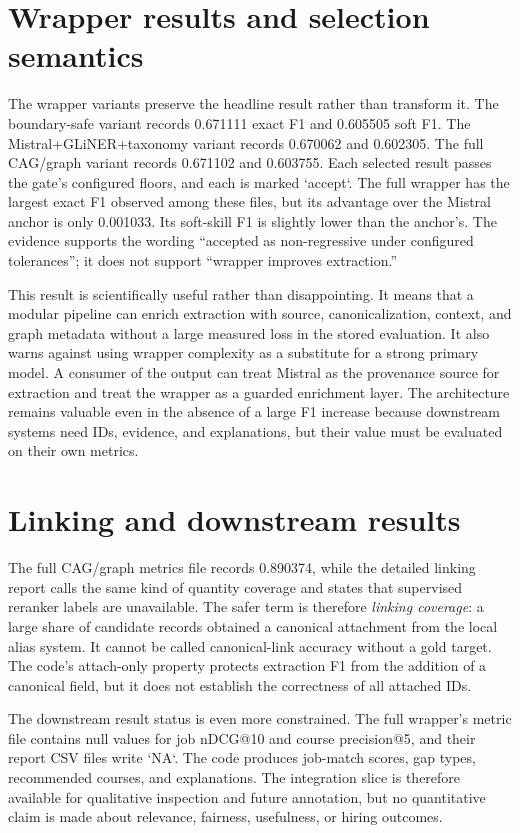 \section{Wrapper results and selection semantics}

The wrapper variants preserve the headline result rather than transform it. The boundary-safe variant records 0.671111 exact F1 and 0.605505 soft F1. The Mistral+GLiNER+taxonomy variant records 0.670062 and 0.602305. The full CAG/graph variant records 0.671102 and 0.603755. Each selected result passes the gate's configured floors, and each is marked `accept`. The full wrapper has the largest exact F1 observed among these files, but its advantage over the Mistral anchor is only 0.001033. Its soft-skill F1 is slightly lower than the anchor's. The evidence supports the wording ``accepted as non-regressive under configured tolerances''; it does not support ``wrapper improves extraction.''

This result is scientifically useful rather than disappointing. It means that a modular pipeline can enrich extraction with source, canonicalization, context, and graph metadata without a large measured loss in the stored evaluation. It also warns against using wrapper complexity as a substitute for a strong primary model. A consumer of the output can treat Mistral as the provenance source for extraction and treat the wrapper as a guarded enrichment layer. The architecture remains valuable even in the absence of a large F1 increase because downstream systems need IDs, evidence, and explanations, but their value must be evaluated on their own metrics.

\section{Linking and downstream results}

The full CAG/graph metrics file records  0.890374, while the detailed linking report calls the same kind of quantity coverage and states that supervised reranker labels are unavailable. The safer term is therefore \emph{linking coverage}: a large share of candidate records obtained a canonical attachment from the local alias system. It cannot be called canonical-link accuracy without a gold target. The code's attach-only property protects extraction F1 from the addition of a canonical field, but it does not establish the correctness of all attached IDs.

The downstream result status is even more constrained. The full wrapper's metric file contains null values for job nDCG@10 and course precision@5, and their report CSV files write `NA`. The code produces job-match scores, gap types, recommended courses, and explanations. The integration slice is therefore available for qualitative inspection and future annotation, but no quantitative claim is made about relevance, fairness, usefulness, or hiring outcomes.

